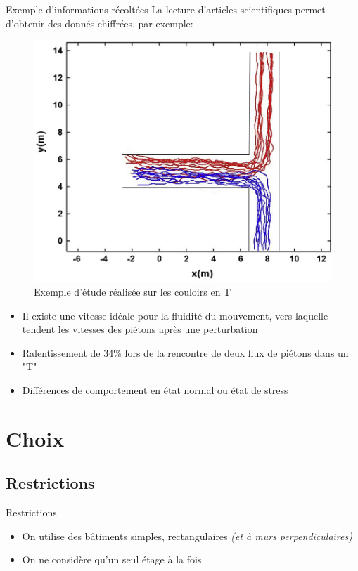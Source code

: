 \documentclass[11pt]{beamer}
\begin{document}
\begin{frame}{Exemple d'informations récoltées}
La lecture d'articles scientifiques permet d'obtenir des donnés chiffrées, par exemple:
\begin{figure}
	\includegraphics[scale=0.1]{T.png}
	\caption{\tiny Exemple d'étude réalisée sur les couloirs en T}
\end{figure}
\begin{itemize}
\item Il existe une vitesse idéale pour la fluidité du mouvement, vers laquelle tendent les vitesses des piétons après une perturbation
\item Ralentissement de 34\% lors de la rencontre de deux flux de piétons dans un "T"
\item Différences de comportement en état normal ou état de stress
\end{itemize}
\end{frame}


\section{Choix}
    \subsection{Restrictions}
    
\begin{frame}{Restrictions}
\begin{itemize}
\item On utilise des bâtiments simples, rectangulaires \textit{(et à murs perpendiculaires)}
\item On ne considère qu'un seul étage à la fois
\end{itemize}
\end{frame}
\end{document}
